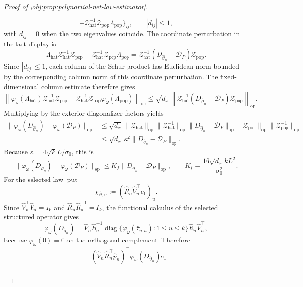 \begin{proof}[Proof of \cref{obj:prop:polynomial-net-law-estimator}]
\begin{enumerate}
\[-\mathcal Z_{\mathrm{hat}}^{-1}\mathcal Z_{\mathrm{pop}}\Lambda_{\mathrm{pop}}\}_{ij},
\qquad |d_{ij}|\le1,
\]
with \(d_{ij}=0\) when the two eigenvalues coincide.  The coordinate perturbation in the last display is
\[
\Lambda_{\mathrm{hat}}\mathcal Z_{\mathrm{hat}}^{-1}\mathcal Z_{\mathrm{pop}}
-\mathcal Z_{\mathrm{hat}}^{-1}\mathcal Z_{\mathrm{pop}}\Lambda_{\mathrm{pop}}
=
\mathcal Z_{\mathrm{hat}}^{-1}
(D_{\widehat\vartheta_n}-\mathcal D_P)
\mathcal Z_{\mathrm{pop}}.
\]
Since \(|d_{ij}|\le1\), each column of the Schur product has Euclidean norm bounded by the corresponding column norm of this coordinate perturbation.  The fixed-dimensional column estimate therefore gives
\[
\left\|
\varphi_\omega(\Lambda_{\mathrm{hat}})\mathcal Z_{\mathrm{hat}}^{-1}\mathcal Z_{\mathrm{pop}}
-\mathcal Z_{\mathrm{hat}}^{-1}\mathcal Z_{\mathrm{pop}}\varphi_\omega(\Lambda_{\mathrm{pop}})
\right\|_{\mathrm{op}}
\le
\sqrt{d_x}\,
\left\|
\mathcal Z_{\mathrm{hat}}^{-1}
(D_{\widehat\vartheta_n}-\mathcal D_P)
\mathcal Z_{\mathrm{pop}}
\right\|_{\mathrm{op}}.
\]
Multiplying by the exterior diagonalizer factors yields
\[
\begin{aligned}
\|\varphi_\omega(D_{\widehat\vartheta_n})-\varphi_\omega(\mathcal D_P)\|_{\mathrm{op}}
&\le
\sqrt{d_x}\,
\|\mathcal Z_{\mathrm{hat}}\|_{\mathrm{op}}
\|\mathcal Z_{\mathrm{hat}}^{-1}\|_{\mathrm{op}}
\|D_{\widehat\vartheta_n}-\mathcal D_P\|_{\mathrm{op}}
\|\mathcal Z_{\mathrm{pop}}\|_{\mathrm{op}}
\|\mathcal Z_{\mathrm{pop}}^{-1}\|_{\mathrm{op}} \\
&\le
\sqrt{d_x}\,\kappa^2
\|D_{\widehat\vartheta_n}-\mathcal D_P\|_{\mathrm{op}}.
\end{aligned}
\]
Because \(\kappa=4\sqrt{k}L/\sigma_0\), this is
\[
\|\varphi_\omega(D_{\widehat\vartheta_n})-\varphi_\omega(\mathcal D_P)\|_{\mathrm{op}}
\le K_f\|D_{\widehat\vartheta_n}-\mathcal D_P\|_{\mathrm{op}},
\qquad
K_f=\frac{16\sqrt{d_x}\,kL^2}{\sigma_0^2}.
\]
For the selected law, put
\[
\chi_{\widehat\vartheta,u}:=(\widehat R_n\widehat V_n^\top e_1)_u .
\]
Since \(\widehat V_n^\top\widehat V_n=I_k\) and \(\widehat R_n\widehat R_n^{-1}=I_k\), the functional calculus of the selected structured operator gives
\[
\varphi_\omega(D_{\widehat\vartheta_n})
=
\widehat V_n\widehat R_n^{-1}
\operatorname{diag}\{\varphi_\omega(\widehat\tau_{n,u}):1\le u\le k\}
\widehat R_n\widehat V_n^\top,
\]
because \(\varphi_\omega(0)=0\) on the orthogonal complement.  Therefore
\[
\begin{aligned}
&(\widehat V_n\widehat R_n^\top\widehat p_n)^\top
\varphi_\omega(D_{\widehat\vartheta_n})e_1 \\

\end{aligned}\]
\end{enumerate}
\end{proof}
